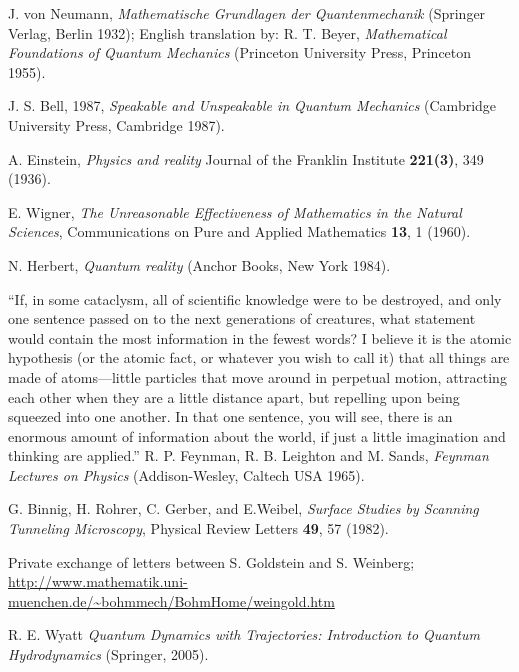 \documentclass[nofootinbib, secnumarabic, amsmath, nobibnotes,11pt,aps,pra, floatfix]{revtex4-1}
\begin{document}
\begin{thebibliography}{999}

J. von Neumann, \emph{Mathematische Grundlagen der Quantenmechanik} (Springer Verlag, Berlin 1932); English translation by: R. T. Beyer, \emph{Mathematical Foundations of Quantum Mechanics} (Princeton University Press, Princeton 1955).

J. S. Bell, 1987, \emph{Speakable and Unspeakable in Quantum Mechanics} (Cambridge University Press, Cambridge 1987).

 A. Einstein, \emph{Physics and reality} Journal of the Franklin Institute \textbf{221(3)},  349 (1936). 

 E. Wigner, \emph{The Unreasonable Effectiveness of Mathematics in the Natural Sciences}, Communications on Pure and Applied Mathematics \textbf{13},  1  (1960). 

 N. Herbert, \emph{Quantum reality} (Anchor Books, New York 1984).

 ``If, in some cataclysm, all of scientific knowledge were to be destroyed, and only one sentence passed on to the next generations of creatures, what statement would contain the most information in the fewest words? I believe it is the atomic hypothesis (or the atomic fact, or whatever you wish to call it) that all things are made of atoms---little particles that move around in perpetual motion, attracting each other when they are a little distance apart, but repelling upon being squeezed into one another. In that one sentence, you will see, there is an enormous amount of information about the world, if just a little imagination and thinking are applied.'' R. P. Feynman, R. B. Leighton and M. Sands, \emph{Feynman Lectures on Physics} (Addison-Wesley, Caltech USA 1965). 

 G. Binnig, H. Rohrer, C. Gerber, and E.Weibel, \emph{Surface Studies by Scanning Tunneling Microscopy}, Physical Review Letters  \textbf{49},    57 (1982).  

Private exchange of letters between S. Goldstein and S. Weinberg; \url{http://www.mathematik.uni-muenchen.de/~bohmmech/BohmHome/weingold.htm}

R. E. Wyatt \emph{Quantum Dynamics with Trajectories: Introduction to Quantum Hydrodynamics} (Springer, 2005).


\end{thebibliography}
\end{document}
